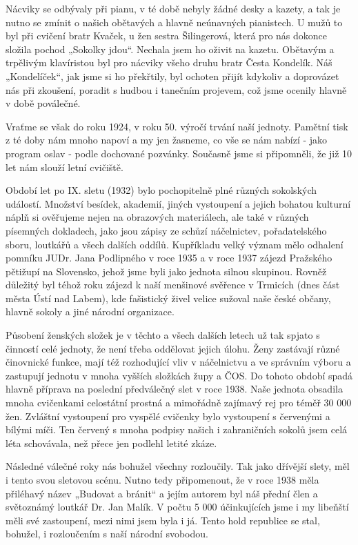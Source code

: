 Nácviky se odbývaly při pianu, v té době nebyly žádné desky a kazety, a
tak je nutno se zmínit o našich obětavých a hlavně neúnavných
pianistech. U mužů to byl při cvičení bratr Kvaček, u žen sestra
Šilingerová, která pro nás dokonce složila pochod „Sokolky jdou``.
Nechala jsem ho oživit na kazetu. Obětavým a trpělivým klavíristou byl
pro nácviky všeho druhu bratr Česta Kondelík. Náš „Kondelíček``, jak
jsme si ho překřtily, byl ochoten přijít kdykoliv a doprovázet nás při
zkoušení, poradit s hudbou i tanečním projevem, což jsme ocenily hlavně
v době poválečné.

Vraťme se však do roku 1924, v roku 50. výročí trvání naší jednoty.
Pamětní tisk z té doby nám mnoho napoví a my jen žasneme, co vše se nám
nabízí - jako program oslav - podle dochované pozvánky. Současně jsme si
připomněli, že již 10 let nám slouží letní cvičiště.

Období let po IX. sletu (1932) bylo pochopitelně plné různých sokolských
událostí. Množství besídek, akademií, jiných vystoupení a jejich bohatou
kulturní náplň si ověřujeme nejen na obrazových materiálech, ale také v
různých písemných dokladech, jako jsou zápisy ze schůzí náčelnictev,
pořadatelského sboru, loutkářů a všech dalších oddílů. Kupříkladu velký
význam mělo odhalení pomníku JUDr. Jana Podlipného v roce 1935 a v roce
1937 zájezd Pražského pětižupí na Slovensko, jehož jsme byli jako
jednota silnou skupinou. Rovněž důležitý byl téhož roku zájezd k naší
menšinové svěřence v Trmicích (dnes část města Ústí nad Labem), kde
fašistický živel velice sužoval naše české občany, hlavně sokoly a jiné
národní organizace.

Působení ženských složek je v těchto a všech dalších letech už tak
spjato s činností celé jednoty, že není třeba oddělovat jejich úlohu.
Ženy zastávají různé činovnické funkce, mají též rozhodující vliv v
náčelnictvu a ve správním výboru a zastupují jednotu v mnoha vyšších
složkách župy a ČOS. Do tohoto období spadá hlavně příprava na poslední
předválečný slet v roce 1938. Naše jednota obsadila mnoha cvičenkami
celostátní prostná a mimořádně zajímavý rej pro téměř 30 000 žen.
Zvláštní vystoupení pro vyspělé cvičenky bylo vystoupení s červenými a
bílými míči. Ten červený s mnoha podpisy našich i zahraničních sokolů
jsem celá léta schovávala, než přece jen podlehl letité zkáze.

Následné válečné roky nás bohužel všechny rozloučily. Tak jako dřívější
slety, měl i tento svou sletovou scénu. Nutno tedy připomenout, že v
roce 1938 měla přiléhavý název „Budovat a bránit`` a jejím autorem byl
náš přední člen a světoznámý loutkář Dr. Jan Malík. V počtu 5 000
účinkujících jsme i my libeňští měli své zastoupení, mezi nimi jsem byla
i já. Tento hold republice se stal, bohužel, i rozloučením s naší
národní svobodou.

